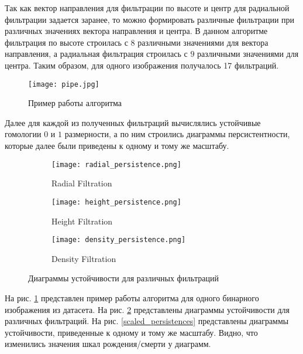 Так как вектор направления для фильтрации по высоте и центр для радиальной фильтрации задается заранее, то можно формировать различные фильтрации при различных значениях вектора направления и центра. В данном алгоритме фильтрация по высоте строилась с $8$ различными значениями для вектора направления, а радиальная фильтрация строилась с $9$ различными значениями для центра. Таким образом, для одного изображения получалось 17 фильтраций.

\begin{figure}[!htbp]
	\begin{center}
		\texttt{[image: pipe.jpg]}\\
		\caption{Пример работы алгоритма}
		\label{example}
	\end{center}
\end{figure}

Далее для каждой из полученных фильтраций вычислялись устойчивые гомологии $0$ и $1$ размерности, а по ним строились диаграммы персистентности, которые далее были приведены к одному и тому же масштабу. 

\begin{figure}[!htbp]
	\begin{subfigure}{.33\textwidth}
		\centering
		\texttt{[image: radial\_persistence.png]}\\
		\caption{Radial Filtration}
	\end{subfigure}%
	\begin{subfigure}{.33\textwidth}
		\centering
		\texttt{[image: height\_persistence.png]}\\
		\caption{Height Filtration}
	\end{subfigure}%
	\begin{subfigure}{.33\textwidth}
		\centering
		\texttt{[image: density\_persistence.png]}\\
		\caption{Density Filtration}
	\end{subfigure}%
	\caption{Диаграммы устойчивости для различных фильтраций}
	\label{persistences}
\end{figure}

 На рис. \ref{example} представлен пример работы алгоритма для одного бинарного изображения из датасета. На рис. \ref{persistences} представлены диаграммы устойчивости для различных фильтраций. На рис. \ref{scaled_persistences} представлены диаграммы устойчивости, приведенные к одному и тому же масштабу. Видно, что изменились значения шкал рождения/смерти у диаграмм.


